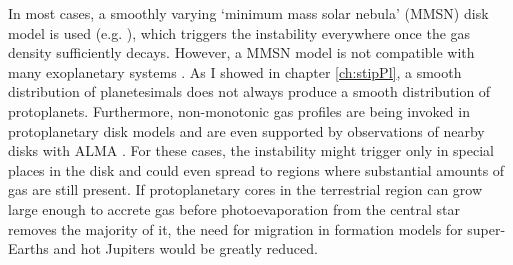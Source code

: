 In most cases, a smoothly varying `minimum mass solar nebula' (MMSN) disk model is used (e.g. \cite{kominami02, dawson15}), which triggers the instability everywhere once the gas density sufficiently decays. However, a MMSN model is not compatible with many exoplanetary systems \cite{chiang13, schlichting14}. As I showed in chapter \ref{ch:stipPl}, a smooth distribution of planetesimals does not always produce a smooth distribution of protoplanets. Furthermore, non-monotonic gas profiles are being invoked in protoplanetary disk models \cite{chatterjee14, ogihara15} and are even supported by observations of nearby disks with ALMA \cite{isella16, andrews16}. For these cases, the instability might trigger only in special places in the disk and could even spread to regions where substantial amounts of gas are still present. If protoplanetary cores in the terrestrial region can grow large enough to accrete gas before photoevaporation from the central star removes the majority of it, the need for migration in formation models for super-Earths and hot Jupiters would be greatly reduced.


